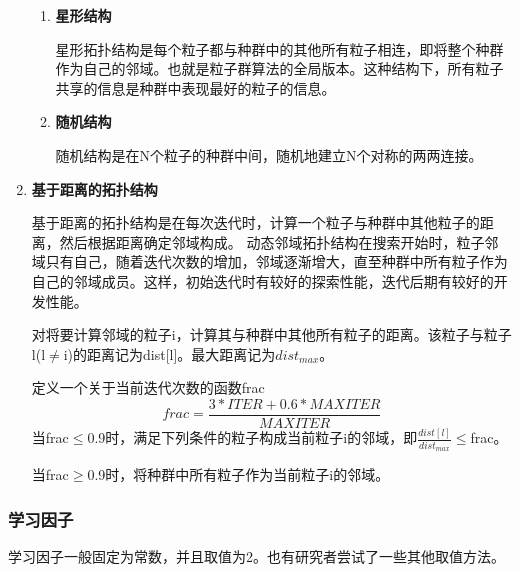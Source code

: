 \begin{enumerate}
\begin{enumerate}
		\item \textbf{星形结构}
		
		\hspace{2em}星形拓扑结构是每个粒子都与种群中的其他所有粒子相连，即将整个种群作为自己的邻域。也就是粒子群算法的全局版本。这种结构下，所有粒子共享的信息是种群中表现最好的粒子的信息。
		\item \textbf{随机结构}
		
		\hspace{2em}随机结构是在N个粒子的种群中间，随机地建立N个对称的两两连接。
	\end{enumerate}
\item \textbf{基于距离的拓扑结构}

\hspace{2em}基于距离的拓扑结构是在每次迭代时，计算一个粒子与种群中其他粒子的距离，然后根据距离确定邻域构成。
动态邻域拓扑结构在搜索开始时，粒子邻域只有自己，随着迭代次数的增加，邻域逐渐增大，直至种群中所有粒子作为自己的邻域成员。这样，初始迭代时有较好的探索性能，迭代后期有较好的开发性能。

\hspace{2em}对将要计算邻域的粒子i，计算其与种群中其他所有粒子的距离。该粒子与粒子l(l$\neq$i)的距离记为dist[l]。最大距离记为$dist_{max}$。

定义一个关于当前迭代次数的函数frac$$frac=\frac{3*ITER+0.6*MAXITER}{MAXITER}$$当frac$\le$0.9时，满足下列条件的粒子构成当前粒子i的邻域，即$\frac{dist[l]}{dist_{max}}$$\le$frac。

当frac$\geq$0.9时，将种群中所有粒子作为当前粒子i的邻域。


\end{enumerate}
\subsubsection{学习因子}
学习因子一般固定为常数，并且取值为2。也有研究者尝试了一些其他取值方法。

